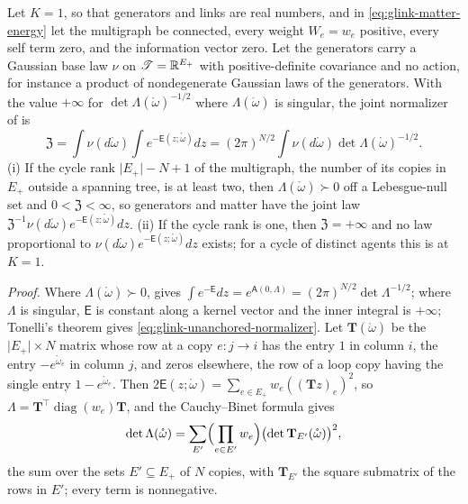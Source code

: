 Let \(K=1\), so that generators and links are real numbers, and in \eqref{eq:glink-matter-energy} let the
multigraph be connected, every weight \(W_e=w_e\) positive, every self term zero, and the information
vector zero. Let the generators carry a Gaussian base law \(\nu\) on \(\mathscr T=\mathbb R^{E_+}\) with
positive-definite covariance and no action, for instance a product of nondegenerate Gaussian laws of the
generators. With the value \(+\infty\) for \(\det\Lambda(\mathring\omega)^{-1/2}\) where \(\Lambda(\mathring\omega)\)
is singular, the joint normalizer of  is
\begin{equation}
\mathfrak Z=\int\nu(d\mathring\omega)\int e^{-\mathsf E(z;\mathring\omega)}dz
=(2\pi)^{N/2}\int\nu(d\mathring\omega)\det\Lambda(\mathring\omega)^{-1/2}.
\label{eq:glink-unanchored-normalizer}
\end{equation}
(i) If the cycle rank \(\lvert E_+\rvert-N+1\) of the multigraph, the number of its copies in \(E_+\)
outside a spanning tree, is at least two, then \(\Lambda(\mathring\omega)\succ0\) off a Lebesgue-null set
and \(0<\mathfrak Z<\infty\), so generators and matter have the joint law
\(\mathfrak Z^{-1}\nu(d\mathring\omega)e^{-\mathsf E(z;\mathring\omega)}dz\).
(ii) If the cycle rank is one, then \(\mathfrak Z=+\infty\) and no law proportional to
\(\nu(d\mathring\omega)e^{-\mathsf E(z;\mathring\omega)}dz\) exists; for a cycle of distinct agents this is
 at \(K=1\). 

\noindent\emph{Proof.}
Where \(\Lambda(\mathring\omega)\succ0\),  gives
\(\int e^{-\mathsf E}dz=e^{\mathsf A(0,\Lambda)}=(2\pi)^{N/2}\det\Lambda^{-1/2}\); where \(\Lambda\) is singular,
\(\mathsf E\) is constant along a kernel vector and the inner integral is \(+\infty\); Tonelli's theorem
gives \eqref{eq:glink-unanchored-normalizer}. Let \(\mathbf T(\mathring\omega)\) be the
\(\lvert E_+\rvert\times N\) matrix whose row at a copy \(e:j\to i\) has the entry \(1\) in column \(i\), the
entry \(-e^{\mathring\omega_e}\) in column \(j\), and zeros elsewhere, the row of a loop copy having the
single entry \(1-e^{\mathring\omega_e}\). Then
\(2\mathsf E(z;\mathring\omega)=\sum_{e\in E_+}w_e((\mathbf Tz)_e)^2\), so
\(\Lambda=\mathbf T^\top\operatorname{diag}(w_e)\mathbf T\), and the Cauchy--Binet formula gives
\[
\det\Lambda(\mathring\omega)=\sum_{E'}\Bigl(\prod_{e\in E'}w_e\Bigr)\bigl(\det\mathbf T_{E'}(\mathring\omega)\bigr)^2,
\]
the sum over the sets \(E'\subseteq E_+\) of \(N\) copies, with \(\mathbf T_{E'}\) the square submatrix of the
rows in \(E'\); every term is nonnegative.

